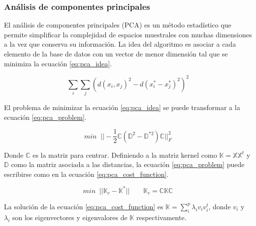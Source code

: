 \subsubsection{Análisis de componentes principales}

El análisis de componentes principales (PCA) es un método estadístico que permite simplificar la complejidad de espacios muestrales con muchas dimensiones a la vez que conserva su información. La idea del algoritmo es asociar a cada elemento de la base de datos con un vector de menor dimensión tal que se minimiza la ecuación \ref{eq:pca_idea}.

\begin{equation}
    \sum_i \sum_j (d(x_i,x_j)^2-d(x^*_i-x_j^*)^2)^2
    \label{eq:pca_idea}
\end{equation}

El problema de minimizar la ecuación \ref*{eq:pca_idea} se puede transformar a la ecuación \ref{eq:pca_problem}.

\begin{equation}
    min\;\; ||-\frac{1}{2}\mathbb{C}(\mathbb{D}^2-\mathbb{D}^{*2})\mathbb{C}||_F^2
    \label{eq:pca_problem}
\end{equation}

Donde $\mathbb{C}$ es la matriz para centrar. Definiendo a la matriz kernel como $\mathbb{K}=\mathbb{X}\mathbb{X}^t$ y $\mathbb{D}$ como la matriz asociada a las distancias, la ecuación \ref{eq:pca_problem} puede escribirse como en la ecuación \ref{eq:pca_cost_function}.

\begin{equation}
    min\;\; ||\mathbb{K}_c-\mathbb{K}^*|| \qquad \mathbb{K}_c = \mathbb{C}\mathbb{K}\mathbb{C}
    \label{eq:pca_cost_function}
\end{equation}

La solución de la ecuación \ref{eq:pca_cost_function} es $\mathbb{K}=\sum\limits_i^p \lambda_i v_i v_i^t $, donde $v_i$ y $\lambda_i$ son los eigenvectores y eigenvalores de $\mathbb{K}$ respectivamente.